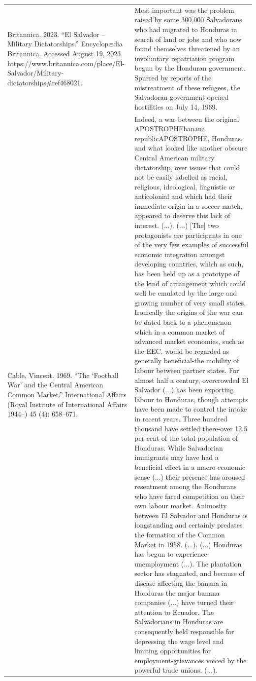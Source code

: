 {\begin{longtable}{p{}p{}}
\\
Britannica. 2023. “El Salvador – Military Dictatorships.” Encyclopædia Britannica. Accessed August 19, 2023. https://www.britannica.com/place/El-Salvador/Military-dictatorships\#ref468021. & Most important was the problem raised by some 300,000 Salvadorans who had migrated to Honduras in search of land or jobs and who now found themselves threatened by an involuntary repatriation program begun by the Honduran government. Spurred by reports of the mistreatment of these refugees, the Salvadoran government opened hostilities on July 14, 1969.
\\
Cable, Vincent. 1969. “The ‘Football War’ and the Central American Common Market.” International Affairs (Royal Institute of International Affairs 1944–) 45 (4): 658–671. & Indeed, a war between the original APOSTROPHEbanana republicAPOSTROPHE, Honduras, and what looked like another obscure Central American military dictatorship, over issues that could not be easily labelled as racial, religious, ideological, linguistic or anticolonial and which had their immediate origin in a soccer match, appeared to deserve this lack of interest. (...). (...) [The] two protagonists are participants in one of the very few examples of successful economic integration amongst developing countries, which as such, has been held up as a prototype of the kind of arrangement which could well be emulated by the large and growing number of very small states. Ironically the origins of the war can be dated back to a phenomenon which in a common market of advanced market economies, such as the EEC, would be regarded as generally beneficial-the mobility of labour between partner states. For almost half a century, overcrowded El Salvador (...) has been exporting labour to Honduras, though attempts have been made to control the intake in recent years. Three hundred thousand have settled there-over 12.5 per cent of the total population of Honduras. While Salvadorian immigrants may have had a beneficial effect in a macro-economic sense (...) their presence has aroused resentment among the Hondurans who have faced competition on their own labour market. Animosity between El Salvador and Honduras is longstanding and certainly predates the formation of the Common Market in 1958. (...). (...) Honduras has begun to experience unemployment (...). The plantation sector has stagnated, and because of disease affecting the banana in Honduras the major banana companies (...) have turned their attention to Ecuador. The Salvadorians in Honduras are consequently held responsible for depressing the wage level and limiting opportunities for employment-grievances voiced by the powerful trade unions. (...). 

\end{longtable}}

